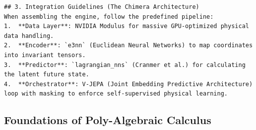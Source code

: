 \documentclass[11pt,a4paper]{article}
\begin{document}
\begin{lstlisting}[language={}, caption={}, basicstyle=\ttfamily\footnotesize, breaklines=true]
## 3. Integration Guidelines (The Chimera Architecture)
When assembling the engine, follow the predefined pipeline:
1.  **Data Layer**: NVIDIA Modulus for massive GPU-optimized physical data handling.
2.  **Encoder**: `e3nn` (Euclidean Neural Networks) to map coordinates into invariant tensors.
3.  **Predictor**: `lagrangian_nns` (Cranmer et al.) for calculating the latent future state.
4.  **Orchestrator**: V-JEPA (Joint Embedding Predictive Architecture) loop with masking to enforce self-supervised physical learning.

\end{lstlisting}

\subsection{Foundations of Poly-Algebraic Calculus}
\end{document}

